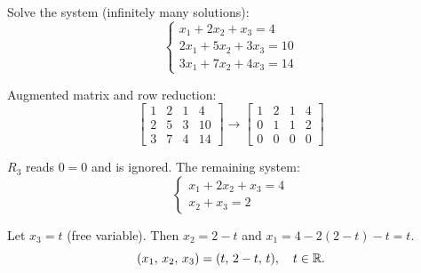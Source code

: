 \begin{example}
  Solve the system (infinitely many solutions):
  \[
    \begin{cases}
      x_1 + 2x_2 + x_3 = 4    \\
      2x_1 + 5x_2 + 3x_3 = 10 \\
      3x_1 + 7x_2 + 4x_3 = 14
    \end{cases}
  \]

  Augmented matrix and row reduction:
  \[
    \left[
      \begin{array}{ccc|c}
        1 & 2 & 1 & 4  \\
        2 & 5 & 3 & 10 \\
        3 & 7 & 4 & 14
      \end{array}
      \right]
    \longrightarrow
    \left[
      \begin{array}{ccc|c}
        1 & 2 & 1 & 4 \\
        0 & 1 & 1 & 2 \\
        0 & 0 & 0 & 0
      \end{array}
      \right]
  \]

  $R_3$ reads $0 = 0$ and is ignored. The remaining system:
  \[
    \begin{cases}
      x_1 + 2x_2 + x_3 = 4 \\
      x_2 + x_3 = 2
    \end{cases}
  \]

  Let $x_3 = t$ (free variable). Then $x_2 = 2 - t$ and $x_1 = 4 - 2(2 - t) - t = t$.
  \[
    (x_1,\, x_2,\, x_3) = (t,\, 2 - t,\, t), \quad t \in \mathbb{R}.
  \]
\end{example}

